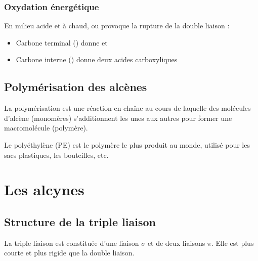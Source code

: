\subsubsection{Oxydation énergétique}

\begin{propriete}
En milieu acide et à chaud,  ou  provoque la rupture de la double liaison :
\begin{itemize}
    \item Carbone terminal () donne  et 
    \item Carbone interne () donne deux acides carboxyliques
\end{itemize}
\end{propriete}

\subsection{Polymérisation des alcènes}

\begin{definition}[Polymérisation]
La polymérisation est une réaction en chaîne au cours de laquelle des molécules d'alcène (monomères) s'additionnent les unes aux autres pour former une macromolécule (polymère).
\end{definition}

\begin{exemple}[Polyéthylène]
\end{exemple}

\begin{remarque}
Le polyéthylène (PE) est le polymère le plus produit au monde, utilisé pour les sacs plastiques, les bouteilles, etc.
\end{remarque}

\section{Les alcynes}

\subsection{Structure de la triple liaison}

\begin{definition}
La triple liaison  est constituée d'une liaison $\sigma$ et de deux liaisons $\pi$. Elle est plus courte et plus rigide que la double liaison.
\end{definition}

